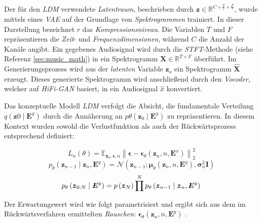 \documentclass[
  a4paper,  %
  twoside,  %
  bibliography=totoc,
  headsepline,
  cleardoublepage=empty,
  parskip=half,
  draft=false
]{scrbook}
\begin{document}
Der für den \emph{LDM} verwendete \emph{Latentraum}, beschrieben durch $\boldsymbol{z} \in \mathbb{R}^{C \times \frac{T}{r} \times \frac{F}{r}}$, wurde mittels eines \emph{VAE} auf der Grundlage von \emph{Spektrogrammen} trainiert. In dieser Darstellung bezeichnet $r$ das \emph{Kompressionsniveau}. Die Variablen $T$ und $F$ repräsentieren die \emph{Zeit}- und \emph{Frequenzdimensionen}, während $C$ die Anzahl der Kanäle angibt. Ein gegebenes Audiosignal wird durch die \emph{STFT}-Methode (siehe Referenz \ref{sec:music_math}) in ein Spektrogramm $\boldsymbol{X} \in \mathbb{R}^{T \times F}$ überführt. Im Generierungsprozess wird aus der \emph{latenten} Variable $\hat{\boldsymbol{z}}_o$ ein Spektrogramm $\hat{\boldsymbol{X}}$ erzeugt. Dieses generierte Spektrogramm wird anschließend durch den \emph{Vocoder}, welcher auf \emph{HiFi-GAN} \cite{kong_hifi-gan_2020} basiert, in ein Audiosignal $\hat{x}$ konvertiert. \cite{liu_audioldm_2023}

Das konzeptuelle Modell \emph{LDM} verfolgt die Absicht, die fundamentale Verteilung $q\left(\boldsymbol{z}0 \mid \boldsymbol{E}^y\right)$ durch die Annäherung an $p\theta\left(\boldsymbol{z}_0 \mid \boldsymbol{E}^y\right)$ zu repräsentieren. In diesem Kontext wurden sowohl die Verlustfunktion als auch der Rückwärtsprozess entsprechend definiert: \cite{liu_audioldm_2023}

\begin{equation}
    L_n(\theta)=\mathbb{E}_{\boldsymbol{z}_0, \boldsymbol{\epsilon}, n}\left\|\boldsymbol{\epsilon}-\boldsymbol{\epsilon}_\theta\left(\boldsymbol{z}_n, n, \boldsymbol{E}^x\right)\right\|_2^2
\end{equation}
\begin{equation}
    p_\theta\left(\boldsymbol{z}_{n-1} \mid \boldsymbol{z}_n, \boldsymbol{E}^y\right)=\mathcal{N}\left(\boldsymbol{z}_{n-1} ; \boldsymbol{\mu}_\theta\left(\boldsymbol{z}_n, n, \boldsymbol{E}^y\right), \boldsymbol{\sigma}_n^2 \boldsymbol{I}\right)
\end{equation}
\begin{equation}
    p_\theta\left(\boldsymbol{z}_{0: N} \mid \boldsymbol{E}^y\right)=p\left(\boldsymbol{z}_N\right) \prod^N p_\theta\left(\boldsymbol{z}_{n-1} \mid \boldsymbol{z}_n, \boldsymbol{E}^y\right) \\
\end{equation}

Der Erwartungswert wird wie folgt parametrisiert und ergibt sich aus dem im Rückwärtsverfahren ermittelten \emph{Rauschen}: $\boldsymbol{\epsilon}_\theta\left(\boldsymbol{z}_n, n, \boldsymbol{E}^y\right)$ \cite{liu_audioldm_2023}.
\end{document}
